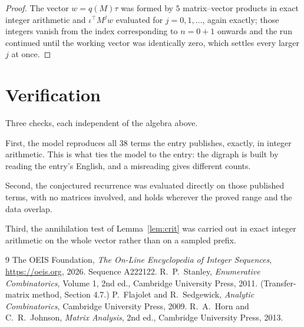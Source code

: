 \documentclass[11pt,a4paper]{article}
\theoremstyle{plain}
\theoremstyle{definition}
\begin{document}
\begin{proof}
The vector $w=q(M)\tau$ was formed by $5$ matrix--vector products in exact integer
arithmetic and $\iota^{\!\top}M^{j}w$ evaluated for $j=0,1,\dots$, again exactly; those
integers vanish from the index corresponding to $n=0+1$ onwards and the run continued
until the working vector was identically zero, which settles every larger $j$ at once.
\end{proof}

\section{Verification}

Three checks, each independent of the algebra above.

First, the model reproduces all $38$ terms the entry publishes, exactly, in integer
arithmetic. This is what ties the model to the entry: the digraph is built by reading the
entry's English, and a misreading gives different counts.

Second, the conjectured recurrence was evaluated directly on those published terms, with no
matrices involved, and holds wherever the proved range and the data overlap.

Third, the annihilation test of Lemma~\ref{lem:crit} was carried out in exact integer
arithmetic on the whole vector rather than on a sampled prefix.

\begin{thebibliography}{9}
 The OEIS Foundation, \emph{The On-Line Encyclopedia of Integer
Sequences}, \url{https://oeis.org}, 2026. Sequence A222122.
 R.~P.~Stanley, \emph{Enumerative Combinatorics}, Volume 1, 2nd ed.,
Cambridge University Press, 2011. (Transfer-matrix method, Section 4.7.)
 P.~Flajolet and R.~Sedgewick, \emph{Analytic Combinatorics}, Cambridge
University Press, 2009.
 R.~A.~Horn and C.~R.~Johnson, \emph{Matrix Analysis}, 2nd ed., Cambridge
University Press, 2013.
\end{thebibliography}
\end{document}
